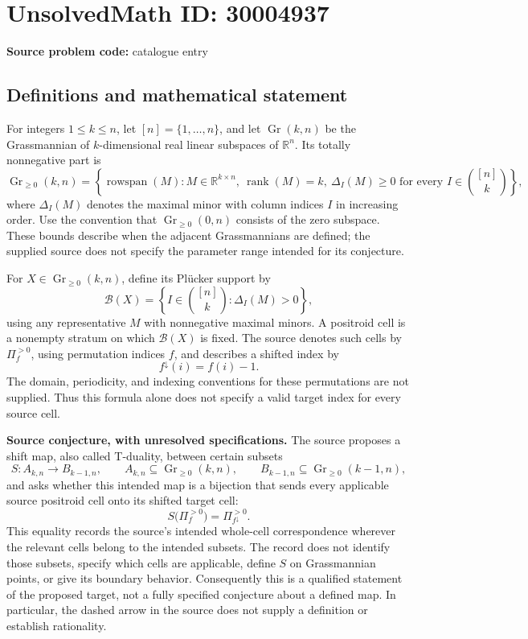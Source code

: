 \documentclass[11pt]{article}
\newcommand{\R}{\mathbb{R}}
\begin{document}
\section*{UnsolvedMath ID: 30004937}
\textbf{Source problem code:} catalogue entry
\subsection{Definitions and mathematical statement}
For integers \(1\leq k\leq n\), let \([n]=\{1,\ldots,n\}\), and let \(\operatorname{Gr}(k,n)\) be the Grassmannian of \(k\)-dimensional real linear subspaces of \(\R^n\). Its totally nonnegative part is
\[
\operatorname{Gr}_{\geq0}(k,n)=\left\{\operatorname{rowspan}(M): M\in\R^{k\times n},\ \operatorname{rank}(M)=k,\ \Delta_I(M)\geq0\text{ for every }I\in\binom{[n]}k\right\},
\]
where \(\Delta_I(M)\) denotes the maximal minor with column indices \(I\) in increasing order. Use the convention that \(\operatorname{Gr}_{\geq0}(0,n)\) consists of the zero subspace. These bounds describe when the adjacent Grassmannians are defined; the supplied source does not specify the parameter range intended for its conjecture.

For \(X\in\operatorname{Gr}_{\geq0}(k,n)\), define its Pl\"ucker support by
\[
\mathcal B(X)=\left\{I\in\binom{[n]}k:\Delta_I(M)>0\right\},
\]
using any representative \(M\) with nonnegative maximal minors. A positroid cell is a nonempty stratum on which \(\mathcal B(X)\) is fixed. The source denotes such cells by \(\Pi_f^{>0}\), using permutation indices \(f\), and describes a shifted index by
\[
f^{\downarrow}(i)=f(i)-1.
\]
The domain, periodicity, and indexing conventions for these permutations are not supplied. Thus this formula alone does not specify a valid target index for every source cell.

\textbf{Source conjecture, with unresolved specifications.} The source proposes a shift map, also called T-duality, between certain subsets
\[
S:A_{k,n}\longrightarrow B_{k-1,n},\qquad
A_{k,n}\subseteq\operatorname{Gr}_{\geq0}(k,n),\qquad
B_{k-1,n}\subseteq\operatorname{Gr}_{\geq0}(k-1,n),
\]
and asks whether this intended map is a bijection that sends every applicable source positroid cell onto its shifted target cell:
\[
S\bigl(\Pi_f^{>0}\bigr)=\Pi_{f^{\downarrow}}^{>0}.
\]
This equality records the source's intended whole-cell correspondence wherever the relevant cells belong to the intended subsets. The record does not identify those subsets, specify which cells are applicable, define \(S\) on Grassmannian points, or give its boundary behavior. Consequently this is a qualified statement of the proposed target, not a fully specified conjecture about a defined map. In particular, the dashed arrow in the source does not supply a definition or establish rationality.
\end{document}
